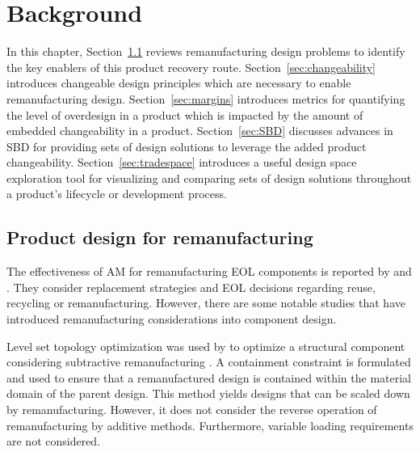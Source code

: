 \chapter{Background}
\label{ch:background}

In this chapter, Section~\ref{sec:remanufacturingdesign} reviews remanufacturing design problems to identify the key enablers of this product recovery route. Section~\ref{sec:changeability} introduces changeable design principles which are necessary to enable remanufacturing design. Section~\ref{sec:margins} introduces metrics for quantifying the level of overdesign in a product which is impacted by the amount of embedded changeability in a product. Section~\ref{sec:SBD} discusses advances in \ac{SBD} for providing sets of design solutions to leverage the added product changeability. Section~\ref{sec:tradespace} introduces a useful design space exploration tool for visualizing and comparing sets of design solutions throughout a product's lifecycle or development process.

\section{Product design for remanufacturing} \label{sec:remanufacturingdesign}

The effectiveness of \ac{AM} for remanufacturing \ac{EOL} components is reported by \citeauthor{VanThao2015} and \citeauthor{Wilson2014} \cite{VanThao2015,Wilson2014}. They consider replacement strategies and \ac{EOL} decisions regarding reuse, recycling or remanufacturing. However, there are some notable studies that have introduced remanufacturing considerations into component design.

Level set topology optimization was used by \citeauthor{Liu2017} to optimize a structural component considering subtractive remanufacturing \cite{Liu2017}. A containment constraint is formulated and used to ensure that a remanufactured design is contained within the material domain of the parent design. This method yields designs that can be scaled down by remanufacturing. However, it does not consider the reverse operation of remanufacturing by additive methods. Furthermore, variable loading requirements are not considered.

